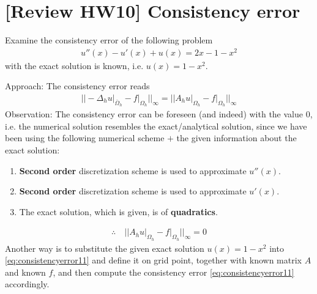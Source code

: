 \documentclass[12pt]{article}
\begin{document}
\section{[Review HW10] Consistency error}
\begin{example}
	Examine the consistency error of the following problem
	\begin{align*}
		u''(x) - u'(x) + u(x) = 2x -1 -x^2
	\end{align*}
	with the exact solution is known, i.e. $u(x) = 1-x^2$.
\end{example}
Approach:
The consistency error reads
\begin{align}
	\label{eq:consistencyerror11}
	\big|\big| -\Delta_{h}u\big|_{\bar{\Omega}_{h}} - f\big|_{\Omega_{h}} \big|\big|	_{\infty}
	=
	\big|\big| A_{h}u\big|_{\Omega_{h}} - f\big|_{\Omega_{h}} \big|\big|_{\infty}
\end{align}
Observation: The consistency error can be foreseen (and indeed) with the value $0$,
i.e. the numerical solution resembles the exact/analytical solution,
since we have been using the following numerical scheme $+$
the given information about the exact solution:
\begin{enumerate}
	\item \textbf{Second order} discretization scheme is used to approximate $u''(x)$.
	\item \textbf{Second order} discretization scheme is used to approximate $u'(x)$.
	\item The exact solution, which is given, is of \textbf{quadratics}.
\end{enumerate}
\begin{align*}
	\therefore\quad\boxed{
	\big|\big| A_{h}u\big|_{\Omega_{h}} - f\big|_{\Omega_{h}} \big|\big|_{\infty} = 0
	}
\end{align*}
Another way is to substitute the given exact solution $u(x) = 1-x^2$ into \eqref{eq:consistencyerror11}
and define it on grid point, together
with known matrix $A$ and known $f$,
and then compute the consistency error \eqref{eq:consistencyerror11} accordingly.


\end{document}
